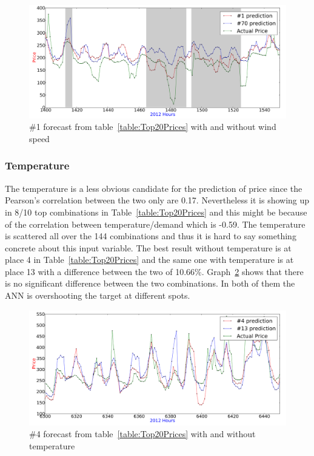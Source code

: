 \begin{figure}[H]
\centering
\includegraphics[width=\linewidth]{billeder/PriceExperimentalAnalysis/X1_windspeed_vs_no_windspeed.png}
\caption{\#1 forecast from table~\ref{table:Top20Prices} with and without wind speed}
\label{fig:Windspeed_no_windspeed}
\end{figure}

\subsubsection{Temperature}
The temperature is a less obvious candidate for the prediction of price since the Pearson's correlation between the two only are 0.17. Nevertheless it is showing up in 8/10 top combinations in Table~\ref{table:Top20Prices} and this might be because of the correlation between temperature/demand which is -0.59. The temperature is scattered all over the 144 combinations and thus it is hard to say something concrete about this input variable. The best result without temperature is at place 4 in Table~\ref{table:Top20Prices} and the same one with temperature is at place 13 with a difference between the two of 10.66\%. Graph~\ref{fig:temperature_comparison} shows that there is no significant difference between the two combinations. In both of them the ANN is overshooting the target at different spots.

\begin{figure}[H]
\centering
\includegraphics[width=\linewidth]{billeder/PriceExperimentalAnalysis/temperatureComparison.png}
\caption{\#4 forecast from table~\ref{table:Top20Prices} with and without temperature}
\label{fig:temperature_comparison}
\end{figure}

